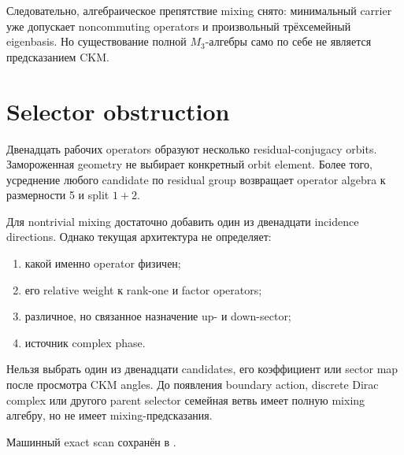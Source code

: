 Следовательно, алгебраическое препятствие mixing снято: минимальный carrier
уже допускает noncommuting operators и произвольный трёхсемейный eigenbasis.
Но существование полной \(M_3\)-алгебры само по себе не является
предсказанием CKM.

\section{Selector obstruction}

Двенадцать рабочих operators образуют несколько residual-conjugacy orbits.
Замороженная geometry не выбирает конкретный orbit element. Более того,
усреднение любого candidate по residual group возвращает operator algebra к
размерности 5 и split \(1+2\).

\begin{proposition}
Для nontrivial mixing достаточно добавить один из двенадцати incidence
directions. Однако текущая архитектура не определяет:
\begin{enumerate}
\item какой именно operator физичен;
\item его relative weight к rank-one и factor operators;
\item различное, но связанное назначение up- и down-sector;
\item источник complex phase.
\end{enumerate}

\end{proposition}

\begin{nogocriterion}
Нельзя выбрать один из двенадцати candidates, его коэффициент или sector map
после просмотра CKM angles. До появления boundary action, discrete Dirac
complex или другого parent selector семейная ветвь имеет полную mixing
алгебру, но не имеет mixing-предсказания.
\end{nogocriterion}

Машинный exact scan сохранён в
.